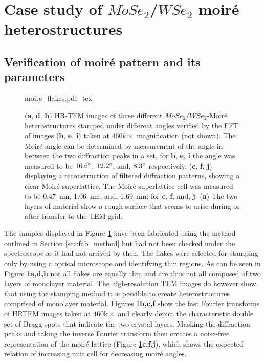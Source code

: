 \section{Case study of $MoSe_2$/$WSe_2$ moiré heterostructures}

\subsection{Verification of moiré pattern and its parameters}

\begin{figure}
    \centering
    \def\svgwidth{.9\linewidth}
    {moire_flakes.pdf_tex}
    \caption{(\textbf{a}, \textbf{d}, \textbf{h}) HR-TEM images of three different $MoSe_2$/$WSe_2$-Moiré heterostructures stamped under different angles verified by the FFT of images (\textbf{b}, \textbf{e}, \textbf{i}) taken at $460k\times$ magnification (not shown). The Moiré angle can be determined by measurement of the angle in between the two diffraction peaks in a set, for \textbf{b}, \textbf{e}, \textbf{i} the angle was measured to be $16.6\degree$, $12.2\degree$, and, $8.3\degree$ respectively. (\textbf{c}, \textbf{f}, \textbf{j}) displaying a reconstruction of filtered diffraction patterns, showing a clear Moiré superlattice. The Moiré superlattice cell was measured to be \SI{0.47}{nm}, \SI{1.06}{nm}, and, \SI{1.69}{nm}; for \textbf{c}, \textbf{f}, and, \textbf{j}. (\textbf{a}) The two layers of material show a rough surface that seems to arise during or after transfer to the TEM grid.}
    \label{fig:moire_overview}
\end{figure}

The samples displayed in Figure \ref{fig:moire_overview} have been fabricated using the method outlined in Section \ref{sec:fab_method} but had not been checked under the spectroscope as it had not arrived by then. The flakes were selected for stamping only by using a optical microscope and identifying thin regions. As can be seen in Figure \ref{fig:moire_overview}\textbf{a,d,h} not all flakes are equally thin and are thus not all composed of two layers of monolayer material. The high-resolution TEM images do however show that using the stamping method it is possible to create heterostructures comprised of monolayer material. Figures \ref{fig:moire_overview}\textbf{b,c,f} show the fast Fourier transforms of HRTEM images taken at $460\mathrm{k}\times$ and clearly depict the characteristic double set of Bragg spots that indicate the two crystal layers. Masking the diffraction peaks and taking the inverse Fourier transform then creates a noise-free representation of the moiré lattice (Figure \ref{fig:moire_overview}\textbf{c,f,j}), which shows the expected relation of increasing unit cell for decreasing moiré angles.


